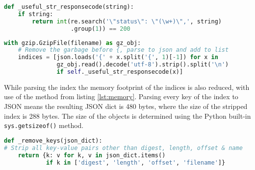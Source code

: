 \begin{lstlisting}[language=Python, caption=Regex solution]
def _useful_str_responsecode(string):
    if string:
        return int(re.search('\"status\": \"(\w+)\",', string)
                   .group(1)) == 200
\end{lstlisting}


\begin{lstlisting}[language=Python, caption=List comprehension creating list of indices, label={lst:comprehension}]
with gzip.GzipFile(filename) as gz_obj:
    # Remove the garbage before {, parse to json and add to list
    indices = [json.loads('{' + x.split('{', 1)[-1]) for x in
               gz_obj.read().decode('utf-8').strip().split('\n')
               if self._useful_str_responsecode(x)]
\end{lstlisting}


While parsing the index the memory footprint of the indices is also reduced, with use of the method from listing \ref{lst:memory}. Parsing every key of the index to JSON means the resulting JSON dict is 480 bytes, where the size of the stripped index is 288 bytes. The size of the objects is determined using the Python built-in \texttt{sys.getsizeof()} method. 

\begin{lstlisting}[language=Python, caption=Reducing memory footprint, label={lst:memory}]
def _remove_keys(json_dict):
# Strip all key-value pairs other than digest, length, offset & name
    return {k: v for k, v in json_dict.items()
            if k in ['digest', 'length', 'offset', 'filename']}
\end{lstlisting}
